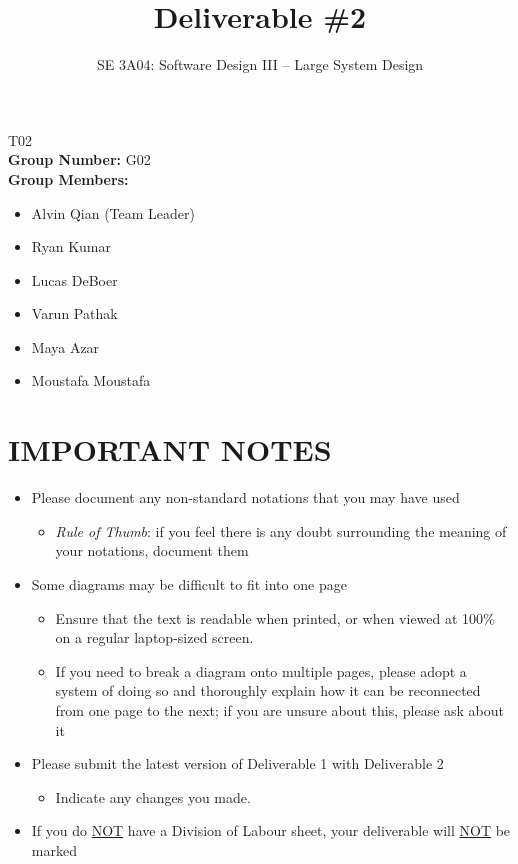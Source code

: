 \documentclass[]{article}
\title{Deliverable \#2}
\author{SE 3A04: Software Design III -- Large System Design}
\date{}
\begin{document}
\maketitle	
{} T02\\
{\bf Group Number:} G02 \\
{\bf Group Members:} 
\begin{itemize}
	\item Alvin Qian (Team Leader)
	\item Ryan Kumar
	\item Lucas DeBoer
	\item Varun Pathak
	\item Maya Azar
	\item Moustafa Moustafa
\end{itemize}

\section*{IMPORTANT NOTES}
\begin{itemize}
	\item Please document any non-standard notations that you may have used
	\begin{itemize}
		\item \emph{Rule of Thumb}: if you feel there is any doubt surrounding the meaning of your notations, document them
	\end{itemize}
	\item Some diagrams may be difficult to fit into one page
	\begin{itemize}
		\item Ensure that the text is readable when printed, or when viewed at 100\% on a regular laptop-sized screen.
		\item If you need to break a diagram onto multiple pages, please adopt a system of doing so and thoroughly explain how it can be reconnected from one page to the next; if you are unsure about this, please ask about it
	\end{itemize}
	\item Please submit the latest version of Deliverable 1 with Deliverable 2
	\begin{itemize}
		\item Indicate any changes you made.
	\end{itemize}
	\item If you do \underline{NOT} have a Division of Labour sheet, your deliverable will \underline{NOT} be marked
\end{itemize}
\end{document}
